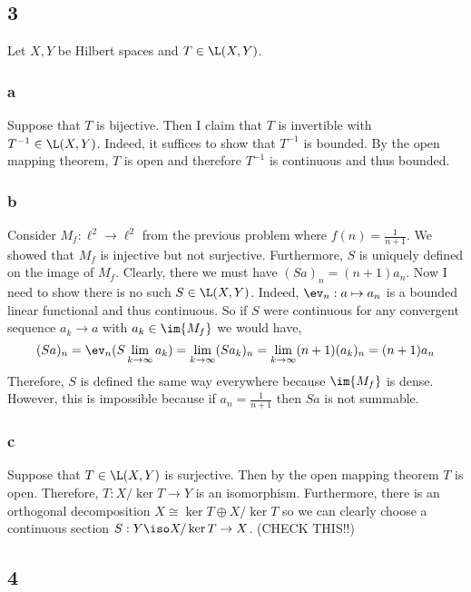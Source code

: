 \documentclass[12pt]{article}
\begin{document}
\subsection{3}

Let $X, Y$ be Hilbert spaces and $T \in \L(X, Y)$.

\subsubsection{a}

Suppose that $T$ is bijective. Then I claim that $T$ is invertible with $T^{-1} \in \L(X, Y)$. Indeed, it suffices to show that $T^{-1}$ is bounded. By the open mapping theorem, $T$ is open and therefore $T^{-1}$ is continuous and thus bounded.

\subsubsection{b}

Consider $M_f : \ell^2 \to \ell^2$ from the previous problem where $f(n) = \frac{1}{n+1}$. We showed that $M_f$ is injective but not surjective. Furthermore, $S$ is uniquely defined on the image of $M_f$. Clearly, there we must have $(S a)_n = (n+1) a_n$. Now I need to show there is no such $S \in \L(X, Y)$. Indeed, $\ev_n : a \mapsto a_n$ is a bounded linear functional and thus continuous. So if $S$ were continuous for any convergent sequence $a_k \to a$ with $a_k \in \im{M_f}$ we would have,
\[ (S a)_n = \ev_n(S \lim_{k \to \infty} a_k) = \lim_{k \to \infty} (S a_k)_n = \lim_{k \to \infty} (n + 1) (a_k)_n = (n + 1) a_n \]
Therefore, $S$ is defined the same way everywhere because $\im{M_f}$ is dense. However, this is impossible because if $a_n = \frac{1}{n+1}$ then $S a$ is not summable.

\subsubsection{c}

Suppose that $T \in \L(X, Y)$ is surjective. Then by the open mapping theorem $T$ is open. Therefore, $T : X / \ker{T} \to Y$ is an isomorphism. Furthermore, there is an orthogonal decomposition $X \cong \ker{T} \oplus X / \ker{T}$ so we can clearly choose a continuous section $S : Y \iso X / \ker{T} \to X$. (CHECK THIS!!)

\subsection{4}
\end{document}
